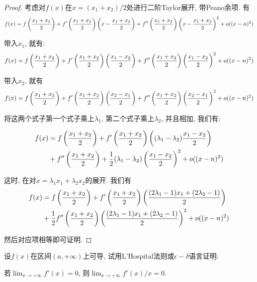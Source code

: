 \begin{proof}
    考虑对$f(x)$在$x=(x_1+x_2)/2$处进行二阶Taylor展开, 带Peano余项. 有
    $$
    f(x)=f\left({x_1+x_2\over 2}\right) +f'\left({x_1+x_2\over 2}\right){\left(x-{x_1+x_2\over 2}\right)}+f''\left({x_1+x_2\over 2}\right){\left(x-{x_1+x_2\over 2}\right)^2}+o((x-n)^2)
    $$

    带入$x_1$, 就有: 
    $$
    f(x)=f\left({x_1+x_2\over 2}\right) +f'\left({x_1+x_2\over 2}\right){\left({x_1-x_2\over 2}\right)}+f''\left({x_1+x_2\over 2}\right){\left({x_1-x_2\over 2}\right)^2}+o((x-n)^2)
    $$

    带入$x_2$, 就有
    $$
    f(x)=f\left({x_1+x_2\over 2}\right) +f'\left({x_1+x_2\over 2}\right){\left({x_2-x_1\over 2}\right)}+f''\left({x_1+x_2\over 2}\right){\left({x_2-x_1\over 2}\right)^2}+o((x-n)^2)
    $$

    将这两个式子第一个式子乘上$\lambda_1$, 第二个式子乘上$\lambda_2$, 并且相加, 我们有:

    $$
    \begin{aligned}
        f(x)&=f\left({x_1+x_2\over 2}\right) +f'\left({x_1+x_2\over 2}\right){\left((\lambda_1-\lambda_2){x_1-x_2\over 2}\right)}\\&+f''\left({x_1+x_2\over 2}\right)+{1\over 2}{(\lambda_1-\lambda_2)\left({x_1-x_2\over 2}\right)^2}+o((x-n)^2)
    \end{aligned}
    $$

    
    这时, 在对$x=\lambda_1x_1+\lambda_2x_2$的展开. 我们有
    $$
    \begin{aligned}
        f(x)&=f\left({x_1+x_2\over 2}\right) +f'\left({x_1+x_2\over 2}\right){\left((2\lambda_1 -1)x_1+(2\lambda_2 -1)\over 2\right)}\\&+{1\over 2}f''\left({x_1+x_2\over 2}\right){\left((2\lambda_1 -1)x_1+(2\lambda_2 -1)\over 2\right)^2}+o((x-n)^2)
    \end{aligned}
        $$

    然后对应项相等即可证明. 

\end{proof}


\begin{prob}%
    设$f(x)$在区间$(a,+\infty)$上可导, 试用L'Hospital法则或$\epsilon-\delta$语言证明:

    若$\lim_{x\to +\infty}f'(x)=0$, 则$\lim_{x\to +\infty}f'(x)/x=0$.

    
\end{prob}

